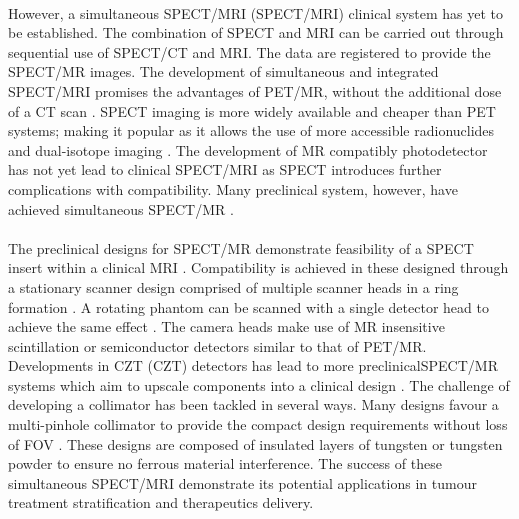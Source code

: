 \paragraph{}
However, a simultaneous \acrlong{SPECT/MRI} (\acrshort{SPECT/MRI}) clinical system has yet to be established. The combination of \acrshort{SPECT} and \acrshort{MRI} can be carried out through sequential use of \acrshort{SPECT/CT} and \acrshort{MRI}. The data are registered to provide the \acrshort{SPECT/MR} images. The development of simultaneous and integrated \acrshort{SPECT/MRI} promises the advantages of \acrshort{PET/MR}, without the additional dose of a \acrshort{CT} scan \cite{en2019ImageStudy}. \acrshort{SPECT} imaging is more widely available and cheaper than \acrshort{PET} systems; making it popular as it allows the use of more accessible radionuclides and dual-isotope imaging \cite{deRosales2014PotentialAgents} \cite{Bateman2012AdvantagesPractice}. The development of \acrshort{MR} compatibly photodetector has not yet lead to clinical \acrshort{SPECT/MRI} as \acrshort{SPECT} introduces further complications with compatibility. Many preclinical system, however, have achieved simultaneous \acrshort{SPECT/MR} \cite{Meng2007DesignImaging}.
\paragraph{}
The preclinical designs for \acrshort{SPECT/MR} demonstrate feasibility of a \acrshort{SPECT} insert within a clinical \acrshort{MRI} \cite{Cai2014MRC-SPECT:Animals}. Compatibility is achieved in these designed through a stationary scanner design comprised of multiple scanner heads in a ring formation \cite{Tsui2011HighAnimals}. A rotating phantom can be scanned with a single detector head to achieve the same effect \cite{Hamamura2010DevelopmentAcquisition.}. The camera heads make use of \acrshort{MR} insensitive scintillation or semiconductor detectors similar to that of \acrshort{PET/MR}. Developments in \acrlong{CZT} (\acrshort{CZT}) detectors has lead to more preclinical\acrshort{SPECT/MR} systems which aim to upscale components into a clinical design \cite{0031-9155-55-6-002} \cite{Tan2011ExperimentalField} \cite{Cai2013HybridSystem}. The challenge of developing a collimator has been tackled in several ways. Many designs favour a multi-pinhole collimator to provide the compact design requirements without loss of \acrshort{FOV} \cite{Meier2011AAnimals}. These designs are composed of insulated layers of tungsten or tungsten powder to ensure no ferrous material interference. The success of these simultaneous \acrshort{SPECT/MRI} demonstrate its potential applications in tumour treatment stratification and therapeutics delivery. 
